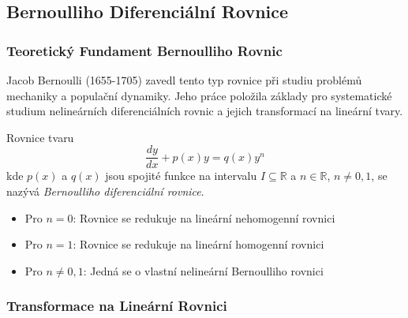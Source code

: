 \subsection{Bernoulliho Diferenciální Rovnice}
\label{subsec:bernoulliho-rovnice}

\subsubsection{Teoretický Fundament Bernoulliho Rovnic}
\label{subsubsec:teoreticky-fundament-bernoulli}

\begin{historical}
Jacob Bernoulli (1655-1705) zavedl tento typ rovnice při studiu problémů mechaniky a populační dynamiky. Jeho práce položila základy pro systematické studium nelineárních diferenciálních rovnic a jejich transformací na lineární tvary.
\end{historical}

\vspace{0.8\baselineskip}

\begin{definition}
\label{def:bernoulliho-rovnice}
Rovnice tvaru
\[
\frac{dy}{dx} + p(x)y = q(x)y^n
\]
kde $p(x)$ a $q(x)$ jsou spojité funkce na intervalu $I \subseteq \mathbb{R}$ a $n \in \mathbb{R}$, $n \neq 0, 1$, se nazývá \emph{Bernoulliho diferenciální rovnice}.
\end{definition}

\vspace{0.6\baselineskip}

\begin{remark}
\label{rem:specialni-pripady}
\begin{itemize}
\item Pro $n = 0$: Rovnice se redukuje na lineární nehomogenní rovnici
\item Pro $n = 1$: Rovnice se redukuje na lineární homogenní rovnici
\item Pro $n \neq 0, 1$: Jedná se o vlastní nelineární Bernoulliho rovnici
\end{itemize}
\end{remark}

\vspace{0.8\baselineskip}

\subsubsection{Transformace na Lineární Rovnici}
\label{subsubsec:transformace-linearni}

